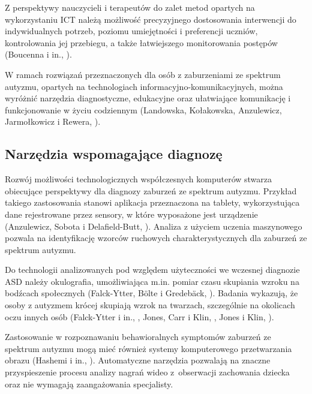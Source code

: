     Z perspektywy nauczycieli i terapeutów do zalet metod opartych na wykorzystaniu ICT należą możliwość precyzyjnego dostosowania interwencji do indywidualnych potrzeb, poziomu umiejętności i preferencji uczniów, kontrolowania jej przebiegu, a także łatwiejszego monitorowania postępów (Boucenna i in., \cite*{boucenna2014interactive}).
    
    
    W ramach rozwiązań przeznaczonych dla osób z zaburzeniami ze spektrum autyzmu, opartych na technologiach informacyjno-komunikacyjnych, można wyróżnić narzędzia diagnostyczne, edukacyjne oraz ułatwiające komunikację i funkcjonowanie w życiu codziennym (Landowska, Kołakowska, Anzulewicz, Jarmołkowicz i Rewera, \cite*{landowska2014technologieWEdukacji}).
    
    \subsection{Narzędzia wspomagające diagnozę}
    Rozwój możliwości technologicznych współczesnych komputerów stwarza obiecujące perspektywy dla diagnozy zaburzeń ze spektrum autyzmu.
    Przykład takiego zastosowania stanowi aplikacja przeznaczona na tablety, wykorzystująca dane rejestrowane przez sensory, w które wyposażone jest urządzenie (Anzulewicz, Sobota i Delafield-Butt, \cite*{anzulewicz2016toward}).
    Analiza z użyciem uczenia maszynowego pozwala na identyfikację wzorców ruchowych charakterystycznych dla zaburzeń ze spektrum autyzmu.
    
    Do technologii analizowanych pod względem użyteczności we wczesnej diagnozie ASD należy okulografia, umożliwiająca m.in. pomiar czasu skupiania wzroku na bodźcach społecznych (Falck-Ytter, B{\"o}lte i Gredeb{\"a}ck, \cite*{falck2013eye}).
    Badania wykazują, że osoby z autyzmem krócej skupiają wzrok na twarzach, szczególnie na okolicach oczu innych osób (Falck-Ytter i in., \cite*{falck2013eye}, Jones, Carr i Klin, \cite*{jones2008absence}, Jones i Klin, \cite*{jones2013attention}).
    
    Zastosowanie w rozpoznawaniu behawioralnych symptomów zaburzeń ze spektrum autyzmu mogą mieć również systemy komputerowego przetwarzania obrazu (Hashemi i in., \cite*{hashemi2012computer}).
    Automatyczne narzędzia pozwalają na znaczne przyspieszenie procesu analizy nagrań wideo z~obserwacji zachowania dziecka oraz nie wymagają zaangażowania specjalisty.
    
